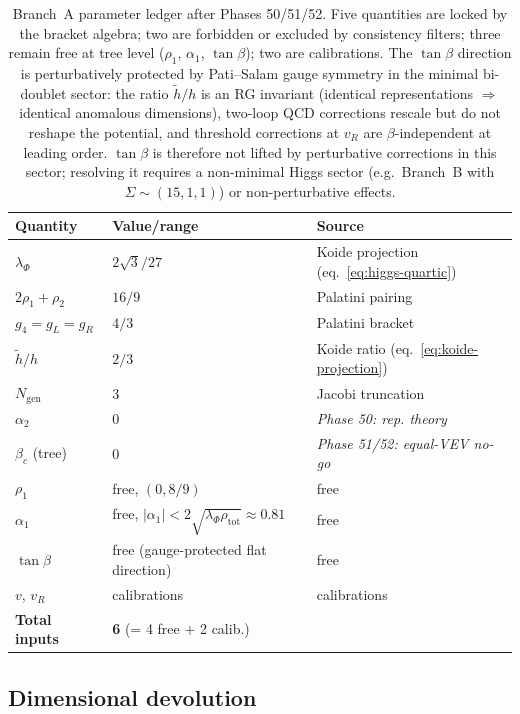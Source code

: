 \documentclass[11pt,a4paper]{article}
\theoremstyle{plain}
\theoremstyle{definition}
\theoremstyle{remark}
\begin{document}
\begin{table}[h]
\centering\small
\begin{tabular}{@{}lll@{}}
\toprule
Quantity & Value/range & Source \\
\midrule
$\lambda_\Phi$ & $2\sqrt{3}/27$ & Koide projection (eq.~\ref{eq:higgs-quartic}) \\
$2\rho_1 + \rho_2$ & $16/9$ & Palatini pairing \\
$g_4 = g_L = g_R$ & $4/3$ & Palatini bracket \\
$\tilde{h}/h$ & $2/3$ & Koide ratio (eq.~\ref{eq:koide-projection}) \\
$N_{\mathrm{gen}}$ & $3$ & Jacobi truncation \\
$\alpha_2$ & $0$ & \emph{Phase 50: rep. theory} \\
$\beta_c$ (tree) & $0$ & \emph{Phase 51/52: equal-VEV no-go} \\
\midrule
$\rho_1$ & free, $(0, 8/9)$ & free \\
$\alpha_1$ & free, $|\alpha_1|<2\sqrt{\lambda_\Phi\rho_{\mathrm{tot}}}\approx 0.81$ & free \\
$\tan\beta$ & free (gauge-protected flat direction) & free \\
$v$, $v_R$ & calibrations & calibrations \\
\midrule
\textbf{Total inputs} & \textbf{6} (= 4 free + 2 calib.) & \\
\bottomrule
\end{tabular}
\caption{Branch~A parameter ledger after Phases 50/51/52.  Five
quantities are locked by the bracket algebra; two are forbidden or
excluded by consistency filters; three remain free at tree level
($\rho_1$, $\alpha_1$, $\tan\beta$); two are calibrations.
The $\tan\beta$ direction is perturbatively protected by
Pati--Salam gauge symmetry in the minimal bi-doublet sector:
the ratio $\tilde{h}/h$ is an RG invariant (identical
representations $\Rightarrow$ identical anomalous dimensions),
two-loop QCD corrections rescale but do not reshape the
potential, and threshold corrections at $v_R$ are
$\beta$-independent at leading order.  $\tan\beta$ is therefore
not lifted by perturbative corrections in this sector;
resolving it requires a non-minimal Higgs sector (e.g.\
Branch~B with $\Sigma \sim (15,1,1)$) or non-perturbative
effects.}
\label{tab:branch-A-ledger}
\end{table}

\subsection{Dimensional devolution}
\end{document}

